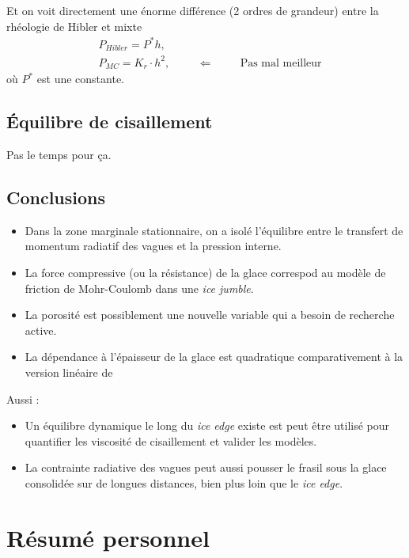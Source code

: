 \documentclass[10pt]{article}
\numberwithin{equation}{section}
\begin{document}
Et on voit directement une énorme différence (2 ordres de grandeur) entre la rhéologie de Hibler et mixte
\begin{align}
   &P_{Hibler} = P^* h,\\
   &P_{MC} = K_r \cdot h^2, \hspace{1cm}\Leftarrow\hspace{1cm}\text{Pas mal meilleur}
\end{align}
où \(P^*\) est une constante.

\subsection{Équilibre de cisaillement}
\label{sec:org71928e4}

Pas le temps pour ça.

\subsection{Conclusions}
\label{sec:org125c932}

\begin{itemize}
\item Dans la zone marginale stationnaire, on a isolé l'équilibre entre le transfert de momentum radiatif des vagues et la pression interne.
\item La force compressive (ou la résistance) de la glace correspod au modèle de friction de Mohr-Coulomb dans une \emph{ice jumble}.
\item La porosité est possiblement une nouvelle variable qui a besoin de recherche active.
\item La dépendance à l'épaisseur de la glace est quadratique comparativement à la version linéaire de \Textcite{hibler1979dynamic}
\end{itemize}

Aussi :
\begin{itemize}
\item Un équilibre dynamique le long du \emph{ice edge} existe est peut être utilisé pour quantifier les viscosité de cisaillement et valider les modèles.
\item La contrainte radiative des vagues peut aussi pousser le frasil sous la glace consolidée sur de longues distances, bien plus loin que le \emph{ice edge}.
\end{itemize}


\section{Résumé personnel}
\label{sec:orgc7a91bb}



\printbibliography
\end{document}
